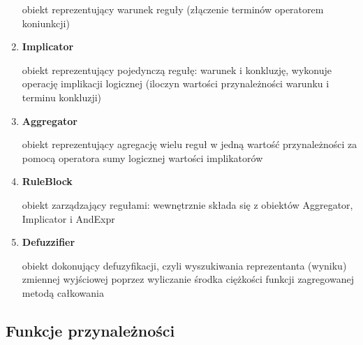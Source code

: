 \documentclass{article}
\begin{document}
\begin{enumerate}
  obiekt reprezentujący warunek reguły (złączenie terminów operatorem koniunkcji)

\item \textbf{Implicator}

  obiekt reprezentujący pojedynczą regułę: warunek i konkluzję, wykonuje
  operację implikacji logicznej (iloczyn wartości przynależności warunku i
  terminu konkluzji)

\item \textbf{Aggregator}

  obiekt reprezentujący agregację wielu reguł w jedną wartość przynależności
  za pomocą operatora sumy logicznej wartości implikatorów

\item \textbf{RuleBlock}

  obiekt zarządzający regułami: wewnętrznie składa się z obiektów Aggregator,
  Implicator i AndExpr

\item \textbf{Defuzzifier}

  obiekt dokonujący defuzyfikacji, czyli wyszukiwania reprezentanta (wyniku) zmiennej
  wyjściowej poprzez wyliczanie środka ciężkości funkcji zagregowanej metodą całkowania

\end{enumerate}

\subsection {Funkcje przynależności}
\end{document}
